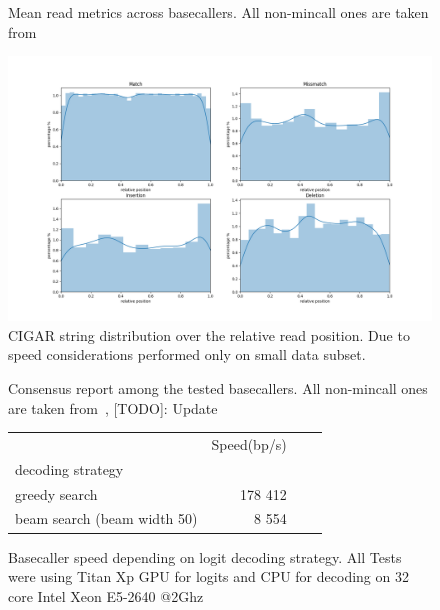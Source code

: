 \documentclass[times, utf8, diplomski, english]{fer}
\begin{document}
\begin{figure}

\caption{Mean read metrics across basecallers. All non-mincall ones are taken from~\cite{rwick_basecalling_cmp}}
\label{fg:tbp:all_metrics}
\end{figure}

\begin{figure}
    \begin{center}
        \includegraphics[width=\textwidth]{alignment_position_report.png}
    \end{center}
    \caption{CIGAR string distribution over the relative read position. Due to speed considerations performed only on small data subset.}
    \label{fg:error_distribution}
\end{figure}

\begin{figure}

\caption{Consensus report among the tested basecallers. All non-mincall ones are taken from~\cite{rwick_basecalling_cmp}, [TODO]: Update}
\label{fg:concensus_report}
\end{figure}

\begin{figure}
\begin{tabular}{lrrr}
\toprule
{}                          &    Speed(bp/s) \\
decoding strategy           &                \\
\midrule
greedy search               &  178 412   \\
beam search (beam width 50) &  8 554     \\
\bottomrule
\end{tabular}
\caption{Basecaller speed depending on logit decoding strategy. All Tests were using Titan Xp GPU for logits and CPU for decoding on 32 core Intel Xeon E5-2640 @2Ghz}
\label{fg:basecaller_speed}
\end{figure}
\end{document}
